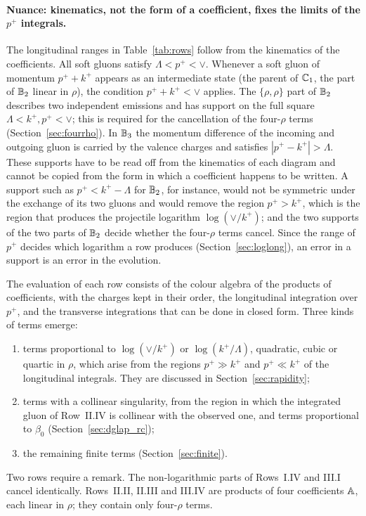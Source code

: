 \paragraph{Nuance: kinematics, not the form of a coefficient, fixes the limits of the $p^+$ integrals.} The longitudinal ranges in Table~\ref{tab:rows} follow from the kinematics of the coefficients. All soft gluons satisfy $\Lambda<p^+<\vee$. Whenever a soft gluon of momentum $p^++k^+$ appears as an intermediate state (the parent of $\mathbb{C}_1$, the part of $\mathbb{B}_2$ linear in $\rho$), the condition $p^++k^+<\vee$ applies. The $\{\rho,\rho\}$ part of $\mathbb{B}_2$ describes two independent emissions and has support on the full square $\Lambda<k^+,p^+<\vee$; this is required for the cancellation of the four-$\rho$ terms (Section~\ref{sec:fourrho}). In $\mathbb{B}_3$ the momentum difference of the incoming and outgoing gluon is carried by the valence charges and satisfies $|p^+-k^+|>\Lambda$. These supports have to be read off from the kinematics of each diagram and cannot be copied from the form in which a coefficient happens to be written. A support such as $p^+<k^+-\Lambda$ for $\mathbb{B}_2$, for instance, would not be symmetric under the exchange of its two gluons and would remove the region $p^+>k^+$, which is the region that produces the projectile logarithm $\log(\vee/k^+)$; and the two supports of the two parts of $\mathbb{B}_2$ decide whether the four-$\rho$ terms cancel. Since the range of $p^+$ decides which logarithm a row produces (Section~\ref{sec:loglong}), an error in a support is an error in the evolution.

The evaluation of each row consists of the colour algebra of the products of coefficients, with the charges kept in their order, the longitudinal integration over $p^+$, and the transverse integrations that can be done in closed form. Three kinds of terms emerge:
\begin{enumerate}
\item terms proportional to $\log(\vee/k^+)$ or $\log(k^+/\Lambda)$, quadratic, cubic or quartic in $\rho$, which arise from the regions $p^+\gg k^+$ and $p^+\ll k^+$ of the longitudinal integrals. They are discussed in Section~\ref{sec:rapidity};
\item terms with a collinear singularity, from the region in which the integrated gluon of Row~II.IV is collinear with the observed one, and terms proportional to $\beta_0$ (Section~\ref{sec:dglap_rc});
\item the remaining finite terms (Section~\ref{sec:finite}).
\end{enumerate}
Two rows require a remark. The non-logarithmic parts of Rows~I.IV and III.I cancel identically. Rows~II.II, II.III and III.IV are products of four coefficients $\mathbb{A}$, each linear in $\rho$; they contain only four-$\rho$ terms.

